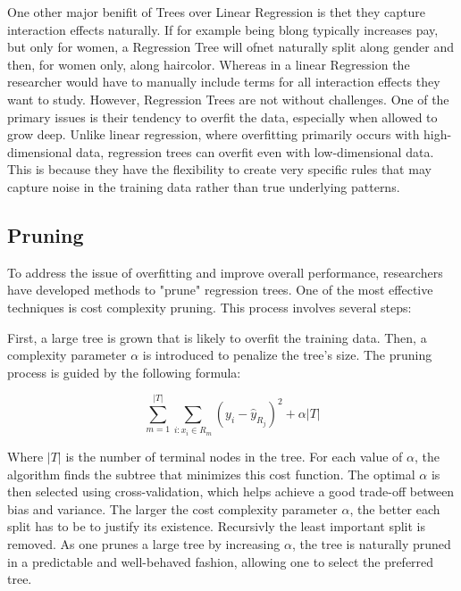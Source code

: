 \documentclass[12pt]{article}
\begin{document}
One other major benifit of Trees over Linear Regression is thet they capture interaction effects naturally. If for example being blong typically increases pay, but only for women, a Regression Tree will ofnet naturally split along gender and then, for women only, along haircolor. Whereas in a linear Regression the researcher would have to manually include terms for all interaction effects they want to study.
However, Regression Trees are not without challenges. One of the primary issues is their tendency to overfit the data, especially when allowed to grow deep. Unlike linear regression, where overfitting primarily occurs with high-dimensional data, regression trees can overfit even with low-dimensional data. This is because they have the flexibility to create very specific rules that may capture noise in the training data rather than true underlying patterns.








\subsection{Pruning}

To address the issue of overfitting and improve overall performance, researchers have developed methods to "prune" regression trees. One of the most effective techniques is cost complexity pruning. This process involves several steps:

First, a large tree is grown that is likely to overfit the training data. Then, a complexity parameter $\alpha$ is introduced to penalize the tree's size. The pruning process is guided by the following formula:

\begin{equation}
    \sum_{m=1}^{|T|} \sum_{i: x_i \in R_m} (y_i - \hat{y}_{R_j})^2 + \alpha|T|
\end{equation}


Where $|T|$ is the number of terminal nodes in the tree. For each value of $\alpha$, the algorithm finds the subtree that minimizes this cost function. The optimal $\alpha$ is then selected using cross-validation, which helps achieve a good trade-off between bias and variance. The larger the cost complexity parameter $\alpha$, the better each split has to be to justify its existence. Recursivly the least important split is removed. As one prunes a large tree by increasing $\alpha$, the tree is naturally pruned in a predictable and well-behaved fashion, allowing one to select the preferred tree.
\end{document}
